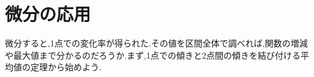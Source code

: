 \chapter{微分の応用}\label{章:微分の応用}
微分すると,1点での変化率が得られた.その値を区間全体で調べれば,関数の増減や最大値まで分かるのだろうか.まず,1点での傾きと2点間の傾きを結び付ける平均値の定理から始めよう.
%
%
%
%
%
%
%
%
%
%
